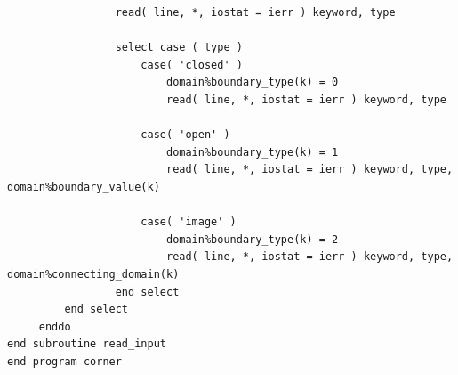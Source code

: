 \documentclass[onecolumn]{article}
\begin{document}
\begin{small}
\begin{verbatim}
                 read( line, *, iostat = ierr ) keyword, type

                 select case ( type )
                     case( 'closed' )
                         domain%boundary_type(k) = 0
                         read( line, *, iostat = ierr ) keyword, type

                     case( 'open' )
                         domain%boundary_type(k) = 1
                         read( line, *, iostat = ierr ) keyword, type, domain%boundary_value(k)

                     case( 'image' )
                         domain%boundary_type(k) = 2
                         read( line, *, iostat = ierr ) keyword, type, domain%connecting_domain(k)
                 end select
         end select
     enddo
end subroutine read_input
end program corner
\end{verbatim}
\end{small}



\end{document}

